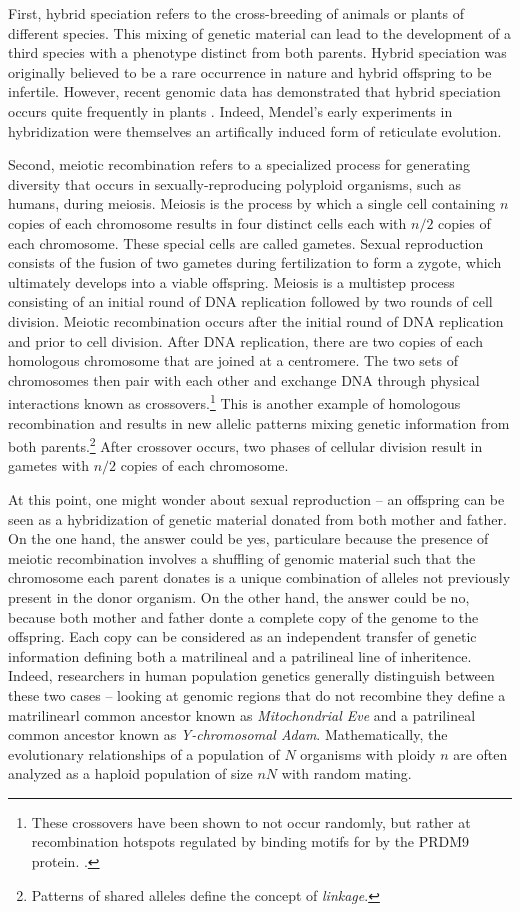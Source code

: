 First, hybrid speciation refers to the cross-breeding of animals or plants of different species.
This mixing of genetic material can lead to the development of a third species with a phenotype distinct from both parents.
Hybrid speciation was originally believed to be a rare occurrence in nature and hybrid offspring to be infertile.
However, recent genomic data has demonstrated that hybrid speciation occurs quite frequently in plants \cite{Arnold:1996,Arnold:2007vq}.
Indeed, Mendel's early experiments in hybridization were themselves an artifically induced form of reticulate evolution.

Second, meiotic recombination refers to a specialized process for generating diversity that occurs in sexually-reproducing polyploid organisms, such as humans, during meiosis.
Meiosis is the process by which a single cell containing $n$ copies of each chromosome results in four distinct cells each with $n/2$ copies of each chromosome.
These special cells are called gametes.
Sexual reproduction consists of the fusion of two gametes during fertilization to form a zygote, which ultimately develops into a viable offspring.
Meiosis is a multistep process consisting of an initial round of DNA replication followed by two rounds of cell division.
Meiotic recombination occurs after the initial round of DNA replication and prior to cell division.
After DNA replication, there are two copies of each homologous chromosome that are joined at a centromere.
The two sets of chromosomes then pair with each other and exchange DNA through physical interactions known as crossovers.\footnote{These crossovers have been shown to not occur randomly, but rather at recombination hotspots regulated by binding motifs for by the PRDM9 protein. .}
This is another example of homologous recombination and results in new allelic patterns mixing genetic information from both parents.\footnote{Patterns of shared alleles define the concept of \emph{linkage}.}
After crossover occurs, two phases of cellular division result in gametes with $n/2$ copies of each chromosome.

At this point, one might wonder about sexual reproduction -- an offspring can be seen as a hybridization of genetic material donated from both mother and father.
On the one hand, the answer could be yes, particulare because the presence of meiotic recombination involves a shuffling of genomic material such that the chromosome each parent donates is a unique combination of alleles not previously present in the donor organism.
On the other hand, the answer could be no, because both mother and father donte a complete copy of the genome to the offspring.
Each copy can be considered as an independent transfer of genetic information defining both a matrilineal and a patrilineal line of inheritence.
Indeed, researchers in human population genetics generally distinguish between these two cases -- looking at genomic regions that do not recombine they define a matrilinearl common ancestor known as \emph{Mitochondrial Eve} and a patrilineal common ancestor known as \emph{Y-chromosomal Adam}.
Mathematically, the evolutionary relationships of a population of $N$ organisms with ploidy $n$ are often analyzed as a haploid population of size $nN$ with random mating.


